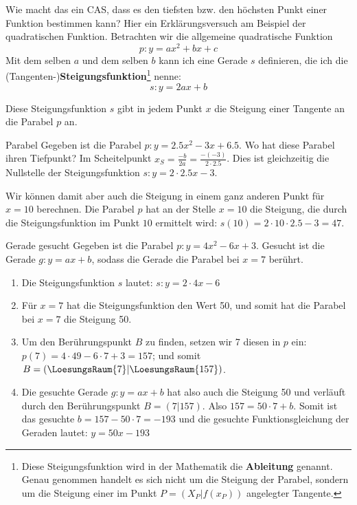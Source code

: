 Wie macht das ein CAS, dass es den tiefsten bzw. den höchsten Punkt
einer Funktion bestimmen kann? Hier ein Erklärungsversuch am Beispiel
der quadratischen Funktion.
Betrachten wir die allgemeine quadratische Funktion $$p: y=ax^2 + bx +
c$$
Mit dem selben $a$ und dem selben $b$ kann ich eine Gerade $s$
definieren, die ich die (Tangenten-)\textbf{Steigungsfunktion}\footnote{Diese
  Steigungsfunktion wird in der Mathematik die
  \textbf{Ableitung} genannt. Genau genommen handelt
  es sich nicht um die Steigung der Parabel, sondern um die Steigung
  einer im Punkt $P=(X_P|f(x_P))$ angelegter Tangente.} nenne:
$$s: y= 2ax+b$$
\newpage


Diese Steigungsfunktion $s$ gibt in jedem Punkt $x$ die Steigung einer
Tangente an die Parabel $p$ an.

\begin{beispiel}{Parabel}{}
  Gegeben ist die Parabel $p: y=2.5x^2 - 3x + 6.5$. Wo hat diese Parabel
  ihren Tiefpunkt? Im Scheitelpunkt $x_S =
  \frac{-b}{2a} = \frac{-(-3)}{2\cdot{}2.5}$. Dies ist gleichzeitig die Nullstelle der
  Steigungsfunktion $s: y= 2\cdot{}2.5x - 3$.

  Wir können damit aber auch die Steigung in einem ganz anderen Punkt
  \zB für $x=10$ berechnen. Die Parabel $p$ hat an der Stelle $x=10$
  die Steigung, die durch die Steigungsfunktion im Punkt $10$
  ermittelt wird: $s(10) = 2\cdot{}10\cdot{2.5} - 3 = 47$.
  
\end{beispiel}

\begin{beispiel}{Gerade gesucht}{}
Gegeben ist die Parabel $p: y=4x^2 -6x + 3$. Gesucht ist die Gerade
$g: y=ax+b$, sodass die Gerade die Parabel bei $x=7$ berührt.

\begin{enumerate}
\item Die Steigungsfunktion $s$ lautet: $s: y=2\cdot{}4x - 6$
\item Für $x=7$ hat die Steigungsfunktion den Wert 50, und somit hat
  die Parabel bei $x=7$ die Steigung 50.
\item Um den Berührungspunkt $B$ zu finden, setzen wir 7 diesen in $p$
  ein: $p(7)= 4\cdot{}49-6\cdot{}7+3 = 157$; und somit $B=(\LoesungsRaum{7}|\LoesungsRaum{157})$.
\item Die gesuchte Gerade $g: y=ax+b$ hat also auch die Steigung 50
  und verläuft durch den Berührungspunkt $B=(7|157)$. Also
  $157=50\cdot{}7+b$. Somit ist das gesuchte $b = 157-50\cdot{}7=-193$
  und die gesuchte Funktionsgleichung der Geraden lautet: $y = 50x-193$
  \end{enumerate}
\end{beispiel}
\newpage

